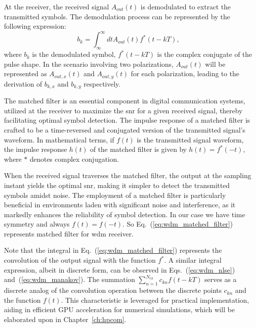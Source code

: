 
At the receiver, the received signal $A_{out}(t)$ is demodulated to extract the transmitted symbols. The demodulation process can be represented by the following expression:
\begin{equation}
b_k = \int^{\infty}_{\infty} dt A_{out}(t) f^{*}(t - kT),
\label{eq:wdm_matched_filter}
\end{equation}
where $b_k$ is the demodulated symbol, $f^{*}(t - kT)$ is the complex conjugate of the pulse shape. In the scenario involving two polarizations, \( A_{out}(t) \) will be represented as \( A_{out,x}(t) \) and \( A_{out,y}(t) \) for each polarization, leading to the derivation of \( b_{k,x} \) and \( b_{k,y} \) respectively.


The matched filter is an essential component in digital communication systems, utilized at the receiver to maximize the \gls{snr} for a given received signal, thereby facilitating optimal symbol detection. The impulse response of a matched filter is crafted to be a time-reversed and conjugated version of the transmitted signal's waveform. In mathematical terms, if \( f(t) \) is the transmitted signal waveform, the impulse response \( h(t) \) of the matched filter is given by \( h(t) = f^*(-t) \), where \( * \) denotes complex conjugation.

When the received signal traverses the matched filter, the output at the sampling instant yields the optimal \Gls{snr}, making it simpler to detect the transmitted symbols amidst noise. The employment of a matched filter is particularly beneficial in environments laden with significant noise and interference, as it markedly enhances the reliability of symbol detection.
In our case we have time symmetry and always $f(t) = f(-t)$. So Eq.~(\ref{eq:wdm_matched_filter}) represents matched filter for \acrshort{wdm} receiver.

Note that the integral in Eq.~(\ref{eq:wdm_matched_filter}) represents the convolution of the output signal with the function \(f^{*}\). A similar integral expression, albeit in discrete form, can be observed in Eqs.~(\ref{eq:wdm_nlse}) and~(\ref{eq:wdm_manakov}). The summation \(\sum_{n=1}^{N_{ch}}  c_{kn}   f(t-kT)\) serves as a discrete analog of the convolution operation between the discrete points \(c_{kn}\) and the function \(f(t)\). This characteristic is leveraged for practical implementation, aiding in efficient GPU acceleration for numerical simulations, which will be elaborated upon in Chapter~\ref{ch:hpcom}.

